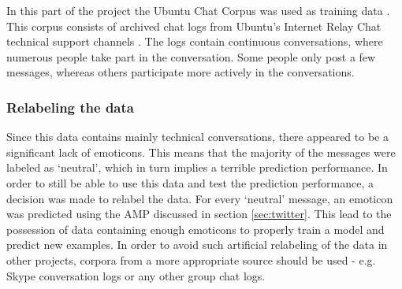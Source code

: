In this part of the project the Ubuntu Chat Corpus was used as training data . This corpus consists of archived chat logs from Ubuntu's Internet Relay Chat technical support channels . The logs contain continuous conversations, where numerous people take part in the conversation. Some people only post a few messages, whereas others participate more actively in the conversations. 

\subsubsection*{Relabeling the data} 
Since this data contains mainly technical conversations, there appeared to be a significant lack of emoticons. This means that the majority of the messages were labeled as `neutral', which in turn implies a terrible prediction performance. In order to still be able to use this data and test the prediction performance, a decision was made to relabel the data. For every `neutral' message, an emoticon was predicted using the AMP discussed in section \ref{sec:twitter}. This lead to the possession of data containing enough emoticons to properly train a model and predict new examples. In order to avoid such artificial relabeling of the data in other projects, corpora from a more appropriate source should be used - e.g. Skype conversation logs or any other group chat logs.
